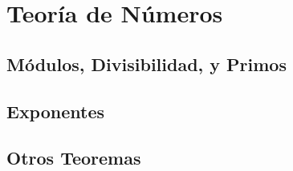 
\chapter{Teoría de Números}

    \section{Módulos, Divisibilidad, y Primos}

    \section{Exponentes}

    \section{Otros Teoremas}
